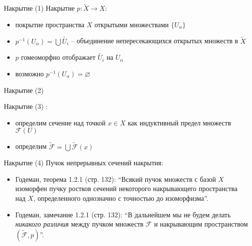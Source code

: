 \documentclass{beamer}
\begin{document}
\begin{frame}{Накрытие (1)}
Накрытие $p : \widetilde{X} \to X$:
\bigskip
\begin{itemize}
	\item покрытие пространства $X$ открытыми множествами $\{ U_\alpha \}$
	\item $p^{-1}(U_\alpha) = \bigcup \widetilde{U_i}$ -- объединение непересекающихся открытых множеств в $\widetilde{X}$
	\item $p$ гомеоморфно отображает $\widetilde{U_i}$ на $U_\alpha$
	\item возможно $p^{-1}(U_\alpha) = \varnothing$
\end{itemize}
\end{frame}

\begin{frame}{Накрытие (2)}
\begin{center}
	\begin{figure}[H]
	\end{figure}
\end{center}
\end{frame}

\begin{frame}{Накрытие (3)}
:\\
\medskip
\begin{itemize}
	\item определим сечение над точкой $x \in X$ как индуктивный предел множеств $\mathcal{F}(U)$
	\item определим $\widetilde{\mathcal{F}} = \bigcup \widetilde{\mathcal{F}}(x)$
\end{itemize}
\end{frame}

\begin{frame}{Накрытие (4)}
Пучок непрерывных сечений накрытия:\\
\medskip
\begin{itemize}
    \item Годеман, теорема 1.2.1 (стр. 132): ``Всякий пучок множеств с базой $X$ изоморфен пучку ростков сечений некоторого накрывающего пространства над $X$, определенного однозначно с точностью до изоморфизма''.
    \smallskip
	\item Годеман, замечание 1.2.1 (стр. 132): ``В дальнейшем мы не будем делать \textit{никакого различия} между пучком множеств $\mathcal{F}$ и накрывающим пространством $(\widetilde{\mathcal{F}}, p)$''.
\end{itemize}
\end{frame}
\end{document}
